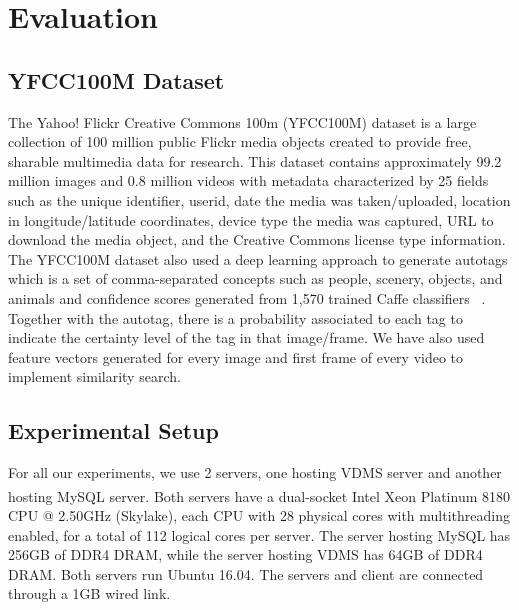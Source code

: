 \section{Evaluation}
\label{eval}

\subsection{YFCC100M Dataset}
\label{dataset}

The Yahoo! Flickr Creative Commons 100m (YFCC100M) dataset is a large
collection of 100 million public Flickr media objects created to provide free,
sharable multimedia data for research. This dataset contains approximately
99.2 million images and 0.8 million videos with metadata characterized by
25 fields such as the unique identifier, userid,
date the media was taken/uploaded, location in longitude/latitude coordinates,
device type the media was captured, URL to download the media object,
and the Creative Commons license type information.
The YFCC100M dataset also used a deep learning approach to generate autotags
which is a set of comma-separated concepts such as people, scenery, objects,
and animals and confidence scores generated from 1,570 trained
Caffe classifiers ~\cite{Thomee_2016}. Together with the autotag, there is a
probability associated to each tag to indicate the certainty level of the tag
in that image/frame.
We have also used feature vectors generated for every image and first frame
of every video \cite{features} to implement similarity search.

\subsection{Experimental Setup}

For all our experiments, we use 2 servers, one hosting VDMS server and
another hosting MySQL server. Both servers have a dual-socket
Intel\textsuperscript{\textregistered}
Xeon\textsuperscript{\textregistered} Platinum 8180 CPU @ 2.50GHz (Skylake),
each CPU with 28 physical cores with multithreading enabled,
for a total of 112 logical cores per server.
The server hosting MySQL has 256GB of DDR4 DRAM, while the server hosting VDMS
has 64GB of DDR4 DRAM. Both servers run Ubuntu 16.04.
The servers and client are connected through a 1GB wired link.

